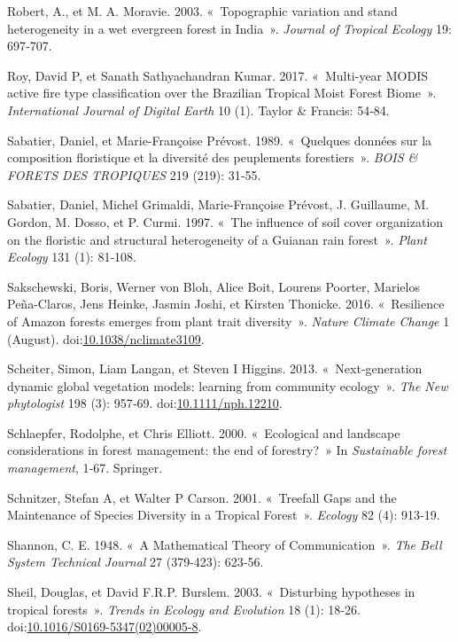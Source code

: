 \documentclass[11pt,french,A4paper,extrafontsizes,onecolumn,openright]{memoir}
\begin{document}
\hypertarget{ref-Robert2003}{}
Robert, A., et M. A. Moravie. 2003. «~Topographic variation and stand
heterogeneity in a wet evergreen forest in India~». \emph{Journal of
Tropical Ecology} 19: 697‑707.

\hypertarget{ref-Roy2017}{}
Roy, David P, et Sanath Sathyachandran Kumar. 2017. «~Multi-year MODIS
active fire type classification over the Brazilian Tropical Moist Forest
Biome~». \emph{International Journal of Digital Earth} 10 (1). Taylor \&
Francis: 54‑84.

\hypertarget{ref-Sabatier1989}{}
Sabatier, Daniel, et Marie-Françoise Prévost. 1989. «~Quelques données
sur la composition floristique et la diversité des peuplements
forestiers~». \emph{BOIS \& FORETS DES TROPIQUES} 219 (219): 31‑55.

\hypertarget{ref-Sabatier1997}{}
Sabatier, Daniel, Michel Grimaldi, Marie-Françoise Prévost, J.
Guillaume, M. Gordon, M. Dosso, et P. Curmi. 1997. «~The influence of
soil cover organization on the floristic and structural heterogeneity of
a Guianan rain forest~». \emph{Plant Ecology} 131 (1): 81‑108.

\hypertarget{ref-Sakschewski2016}{}
Sakschewski, Boris, Werner von Bloh, Alice Boit, Lourens Poorter,
Marielos Peña-Claros, Jens Heinke, Jasmin Joshi, et Kirsten Thonicke.
2016. «~Resilience of Amazon forests emerges from plant trait
diversity~». \emph{Nature Climate Change} 1 (August).
doi:\href{https://doi.org/10.1038/nclimate3109}{10.1038/nclimate3109}.

\hypertarget{ref-Scheiter2013}{}
Scheiter, Simon, Liam Langan, et Steven I Higgins. 2013.
«~Next-generation dynamic global vegetation models: learning from
community ecology~». \emph{The New phytologist} 198 (3): 957‑69.
doi:\href{https://doi.org/10.1111/nph.12210}{10.1111/nph.12210}.

\hypertarget{ref-Schlaepfer2000}{}
Schlaepfer, Rodolphe, et Chris Elliott. 2000. «~Ecological and landscape
considerations in forest management: the end of forestry?~» In
\emph{Sustainable forest management}, 1‑67. Springer.

\hypertarget{ref-Schnitzer2001}{}
Schnitzer, Stefan A, et Walter P Carson. 2001. «~Treefall Gaps and the
Maintenance of Species Diversity in a Tropical Forest~». \emph{Ecology}
82 (4): 913‑19.

\hypertarget{ref-Shannon1948}{}
Shannon, C. E. 1948. «~A Mathematical Theory of Communication~».
\emph{The Bell System Technical Journal} 27 (379-423): 623‑56.

\hypertarget{ref-Sheil2003}{}
Sheil, Douglas, et David F.R.P. Burslem. 2003. «~Disturbing hypotheses
in tropical forests~». \emph{Trends in Ecology and Evolution} 18 (1):
18‑26.
doi:\href{https://doi.org/10.1016/S0169-5347(02)00005-8}{10.1016/S0169-5347(02)00005-8}.
\end{document}
